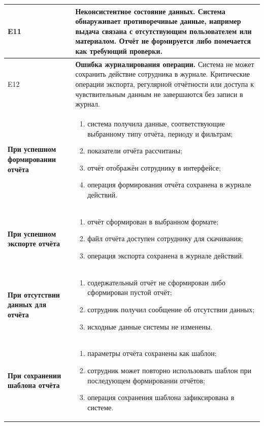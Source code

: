 \documentclass[12pt,a4paper]{article}
\begin{document}
\begin{xltabular}{\textwidth}{
				|>{\raggedright\arraybackslash}p{2.7cm}
				|>{\raggedright\arraybackslash}X|
			}
			E11 &
			\textbf{Неконсистентное состояние данных.}
			Система обнаруживает противоречивые данные, например выдача связана
			с отсутствующим пользователем или материалом. Отчёт не формируется
			либо помечается как требующий проверки. \\
			\hline
			
			E12 &
			\textbf{Ошибка журналирования операции.}
			Система не может сохранить действие сотрудника в журнале. Критические
			операции экспорта, регулярной отчётности или доступа к чувствительным
			данным не завершаются без записи в журнал. \\
			\hline
			
			
			\textbf{При успешном формировании отчёта} &
			\begin{enumerate}
				\item система получила данные, соответствующие выбранному типу отчёта,
				периоду и фильтрам;
				\item показатели отчёта рассчитаны;
				\item отчёт отображён сотруднику в интерфейсе;
				\item операция формирования отчёта сохранена в журнале действий.
			\end{enumerate} \\
			\hline
			
			\textbf{При успешном экспорте отчёта} &
			\begin{enumerate}
				\item отчёт сформирован в выбранном формате;
				\item файл отчёта доступен сотруднику для скачивания;
				\item операция экспорта сохранена в журнале действий.
			\end{enumerate} \\
			\hline
			
			\textbf{При отсутствии данных для отчёта} &
			\begin{enumerate}
				\item содержательный отчёт не сформирован либо сформирован пустой отчёт;
				\item сотрудник получил сообщение об отсутствии данных;
				\item исходные данные системы не изменены.
			\end{enumerate} \\
			\hline
			
			\textbf{При сохранении шаблона отчёта} &
			\begin{enumerate}
				\item параметры отчёта сохранены как шаблон;
				\item сотрудник может повторно использовать шаблон при последующем
				формировании отчётов;
				\item операция сохранения шаблона зафиксирована в системе.
			\end{enumerate} \\
			\hline
			

\end{xltabular}
\end{document}
